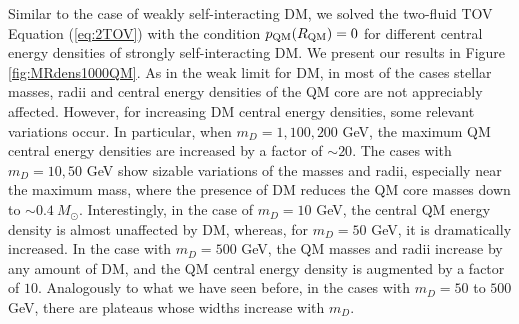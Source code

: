 \documentclass[universe,article,accept,moreauthors,pdftex]{Definitions/mdpi}
\begin{document}
Similar to the case of weakly self-interacting DM, we solved the two-fluid TOV Equation (\ref{eq:2TOV}) with the condition $p_{\rm QM}(R_{\rm QM})=0$ for different central energy densities of strongly self-interacting DM. We present our results in Figure \ref{fig:MRdens1000QM}. As in the weak limit for DM, in most of the cases stellar masses, radii and central energy densities of the QM core are not appreciably affected. However, for increasing DM central energy densities, some relevant variations occur. In particular, when $m_{D}=1, 100, 200$ GeV, the maximum QM central energy densities are increased by a factor of $\sim$$20$. The cases with $m_{D}=10, 50$ GeV show sizable variations of the masses and radii, especially near the maximum mass, where the presence of DM reduces the QM core masses down to $\sim$${0.4}~M_{\odot}$. Interestingly, in the case of $m_{D}=10$ GeV, the central QM energy density is almost unaffected by DM, whereas, for $m_{D}=50$ GeV, it is dramatically increased. In the case with $m_{D}=500$ GeV, the QM masses and radii increase by any amount of DM, and the QM central energy density is augmented by a factor of $10$. Analogously to what we have seen before, in the cases with $m_{D}=50$ to $500$ GeV, there are plateaus whose widths increase with $m_{D}$. 
\end{document}
